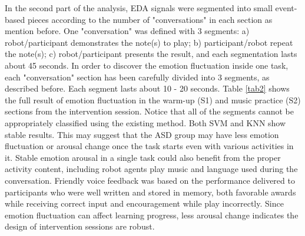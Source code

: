 In the second part of the analysis, EDA signals were segmented into small event-based pieces according to 
the number of "conversations" in each section as mention before. One "conversation" was defined with 3 segments:
a) robot/participant demonstrates the note(s) to play; b) participant/robot repeat the note(s); 
c) robot/participant presents the result, and each segmentation lasts about 45 seconds.
In order to discover the emotion fluctuation inside one task, each "conversation" section
has been carefully divided into 3 segments, as described before. Each segment lasts about 10 - 20 seconds.
Table \ref{tab2} shows the full result of
emotion fluctuation in the warm-up (S1) and music practice (S2) sections from the intervention session. Notice that
all of the segments cannot be appropriately classified using the existing method. Both SVM and KNN show
stable results. This may suggest that the ASD group may have less emotion fluctuation or arousal
change once the task starts even with various activities in it. Stable emotion arousal in a single task
could also benefit from the proper activity content, including robot agents play music and language
used during the conversation. Friendly voice feedback was based on the performance delivered to participants
who were well written and stored in memory, both favorable awards while receiving correct input and encouragement
while play incorrectly. Since emotion fluctuation can affect learning progress, less arousal change 
indicates the design of intervention sessions are robust. 

